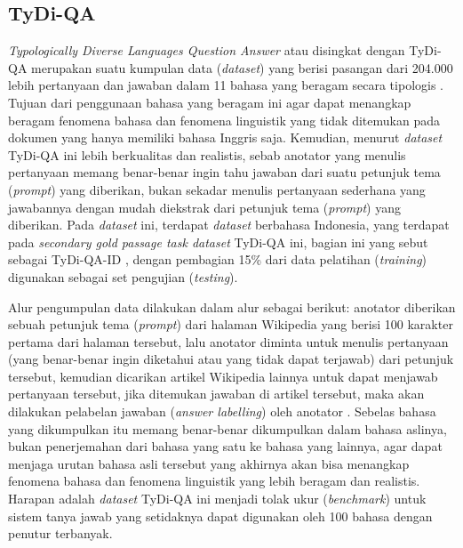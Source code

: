 \subsection{TyDi-QA}
\label{2.2.2}
\emph{Typologically Diverse Languages Question Answer} atau disingkat dengan TyDi-QA merupakan suatu kumpulan data (\emph{dataset}) yang berisi pasangan dari 204.000 lebih pertanyaan dan jawaban dalam 11 bahasa yang beragam secara tipologis \citep{clark-etal-2020-tydi}. Tujuan dari penggunaan bahasa yang beragam ini agar dapat menangkap beragam fenomena bahasa dan fenomena linguistik yang tidak ditemukan pada dokumen yang hanya memiliki bahasa Inggris saja. Kemudian, menurut \citet{clark-etal-2020-tydi} \emph{dataset} TyDi-QA ini lebih berkualitas dan realistis, sebab anotator yang menulis pertanyaan memang benar-benar ingin tahu jawaban dari suatu petunjuk tema (\emph{prompt}) yang diberikan, bukan sekadar menulis pertanyaan sederhana yang jawabannya dengan mudah diekstrak dari petunjuk tema (\emph{prompt}) yang diberikan. Pada \emph{dataset} ini, terdapat \emph{dataset} berbahasa Indonesia, yang terdapat pada \emph{secondary gold passage task dataset} TyDi-QA ini, bagian ini yang \citet{cahyawijaya-etal-2021-indonlg} sebut sebagai TyDi-QA-ID , dengan pembagian 15\% dari data pelatihan (\emph{training}) digunakan sebagai set pengujian (\emph{testing}).

Alur pengumpulan data dilakukan dalam alur sebagai berikut: anotator diberikan sebuah petunjuk tema (\emph{prompt}) dari halaman Wikipedia yang berisi 100 karakter pertama dari halaman tersebut, lalu anotator diminta untuk menulis pertanyaan (yang benar-benar ingin diketahui atau yang tidak dapat terjawab) dari petunjuk tersebut, kemudian dicarikan artikel Wikipedia lainnya untuk dapat menjawab pertanyaan tersebut, jika ditemukan jawaban di artikel tersebut, maka akan dilakukan pelabelan jawaban (\emph{answer labelling}) oleh anotator \citep{clark-etal-2020-tydi}. Sebelas bahasa yang dikumpulkan itu memang benar-benar dikumpulkan dalam bahasa aslinya, bukan penerjemahan dari bahasa yang satu ke bahasa yang lainnya, agar dapat menjaga urutan bahasa asli tersebut yang akhirnya akan bisa menangkap fenomena bahasa dan fenomena linguistik yang lebih beragam dan realistis. Harapan \citet{clark-etal-2020-tydi} adalah \emph{dataset} TyDi-QA ini menjadi tolak ukur (\emph{benchmark}) untuk sistem tanya jawab yang setidaknya dapat digunakan oleh 100 bahasa dengan penutur terbanyak.

